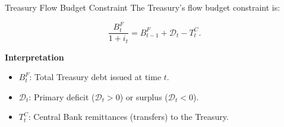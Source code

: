 \documentclass[11pt,aspectratio=169]{beamer}
\begin{document}
\begin{frame}{Treasury Flow Budget Constraint}
\small
The Treasury’s flow budget constraint is:

\begin{equation}
\frac{B_{t}^{F}}{1+i_{t}}=B_{t-1}^{F}+\mathcal{D}_{t}-T_{t}^{C}. \label{FlowT}
\end{equation}

\vspace{0.4cm}
\textbf{Interpretation}
\begin{itemize}
    \item $B_{t}^{F}$: Total Treasury debt issued at time $t$.
    \item $\mathcal{D}_{t}$: Primary deficit ($\mathcal{D}_{t} > 0$) or surplus ($\mathcal{D}_{t} < 0$).
    \item $T_{t}^{C}$: Central Bank remittances (transfers) to the Treasury.
\end{itemize}
\end{frame}
\end{document}
